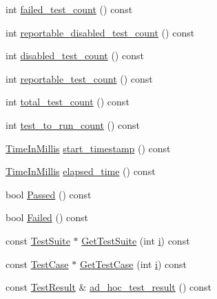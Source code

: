 \begin{DoxyCompactItemize}
int \mbox{\hyperlink{classtesting_1_1_unit_test_ace1c860482b4ae5c341df5a9665e5c08}{failed\+\_\+test\+\_\+count}} () const
\item 
int \mbox{\hyperlink{classtesting_1_1_unit_test_a2a2835db178d5c8569507db9f0a3d54f}{reportable\+\_\+disabled\+\_\+test\+\_\+count}} () const
\item 
int \mbox{\hyperlink{classtesting_1_1_unit_test_ad69ccf3d4a9bc7333badeafbde3bc76b}{disabled\+\_\+test\+\_\+count}} () const
\item 
int \mbox{\hyperlink{classtesting_1_1_unit_test_a449d0e0350ef146040cd37679c005248}{reportable\+\_\+test\+\_\+count}} () const
\item 
int \mbox{\hyperlink{classtesting_1_1_unit_test_af6e02fcf76fd7247687f4e8af6e7ef41}{total\+\_\+test\+\_\+count}} () const
\item 
int \mbox{\hyperlink{classtesting_1_1_unit_test_a461f46b2976f135d2a65e8d3def746e9}{test\+\_\+to\+\_\+run\+\_\+count}} () const
\item 
\mbox{\hyperlink{namespacetesting_a992de1d091ce660f451d1e8b3ce30fd6}{Time\+In\+Millis}} \mbox{\hyperlink{classtesting_1_1_unit_test_a3d83fe1cc5570a1c34f9754b0f56d65f}{start\+\_\+timestamp}} () const
\item 
\mbox{\hyperlink{namespacetesting_a992de1d091ce660f451d1e8b3ce30fd6}{Time\+In\+Millis}} \mbox{\hyperlink{classtesting_1_1_unit_test_acf608411a17cb3b40a1e9d724f262b3b}{elapsed\+\_\+time}} () const
\item 
bool \mbox{\hyperlink{classtesting_1_1_unit_test_a7c9b327bc14cb8a282c789dc6513a55b}{Passed}} () const
\item 
bool \mbox{\hyperlink{classtesting_1_1_unit_test_a706f29e765916616b11a271a65948727}{Failed}} () const
\item 
const \mbox{\hyperlink{classtesting_1_1_test_suite}{Test\+Suite}} $\ast$ \mbox{\hyperlink{classtesting_1_1_unit_test_a9875be4cde301a6bef1788cdd65a0f84}{Get\+Test\+Suite}} (int \mbox{\hyperlink{_obj__test_2lib_2googletest-master_2googlemock_2test_2gmock-matchers__test_8cc_acb559820d9ca11295b4500f179ef6392}{i}}) const
\item 
const \mbox{\hyperlink{classtesting_1_1_test_case}{Test\+Case}} $\ast$ \mbox{\hyperlink{classtesting_1_1_unit_test_a724d4c8be4481e0c1523a22b72dc7dac}{Get\+Test\+Case}} (int \mbox{\hyperlink{_obj__test_2lib_2googletest-master_2googlemock_2test_2gmock-matchers__test_8cc_acb559820d9ca11295b4500f179ef6392}{i}}) const
\item 
const \mbox{\hyperlink{classtesting_1_1_test_result}{Test\+Result}} \& \mbox{\hyperlink{classtesting_1_1_unit_test_aa59dde4c3dc43a920ed142a27670686c}{ad\+\_\+hoc\+\_\+test\+\_\+result}} () const

\end{DoxyCompactItemize}
